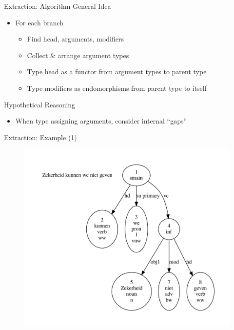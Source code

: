 \documentclass{beamer}
\begin{document}
\begin{frame}{Extraction: Algorithm}
	\alert{General Idea}
	\begin{itemize}
		\item[] For each branch
			\begin{itemize}
				\item Find head, arguments, modifiers
				\item Collect \& arrange argument types
				\item Type head as a functor from argument types to parent type
				\item Type modifiers as endomorphisms from parent type to itself
			\end{itemize}
	\end{itemize}
	
	\alert{Hypothetical Reasoning}
	\begin{itemize}
		\item[] When type assigning arguments, consider internal ``gaps''
	\end{itemize}
\end{frame}

{
\begin{frame}{Extraction: Example (1)}
	\begin{figure}
		\includegraphics[scale=0.5]{zekerheid.pdf}
	\end{figure}
\end{frame}
}
\end{document}
